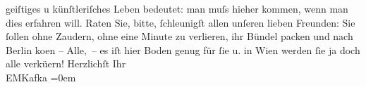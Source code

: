 \begin{ledgroupsized}[t]{13cm}
                    geiſtiges u künſtleriſches Leben bedeutet: man muſs hieher kommen, wenn man dies
                    erfahren will.\pend
           \pstart
           Raten Sie, bitte, ſchleunigſt allen unſeren lieben Freunden: Sie ſollen ohne
                    Zaudern, ohne eine Minute zu verlieren, ihr Bündel packen und nach Berlin ko{\geminationm}en –
                    Alle, – es iſt hier Boden genug für ſie u. in Wien werden ſie \introOben{}ja\introOben{} doch alle verkü{\geminationm}ern! \pend
           \pstart
           Herzlichſt Ihr{\\[\baselineskip]}EMKafka\pend
           \leftskip=0em{}\pstart
           \noindent{}\label{T_L00158_1v}\label{T_L00158_1h}\pend
                     \endnumbering{}\end{ledgroupsized}  \newcommand{\dateiname}{L00158}\newcommand{\titel}{Eduard Michael Kafka an Arthur Schnitzler, 12. 1. 1893}\newcommand{\editorInnen}{Martin Anton Müller und Gerd-Hermann Susen}
            \footnotesize
\begin{ledgroupsized}[t]{11.5cm}
\end{ledgroupsized}
         
      